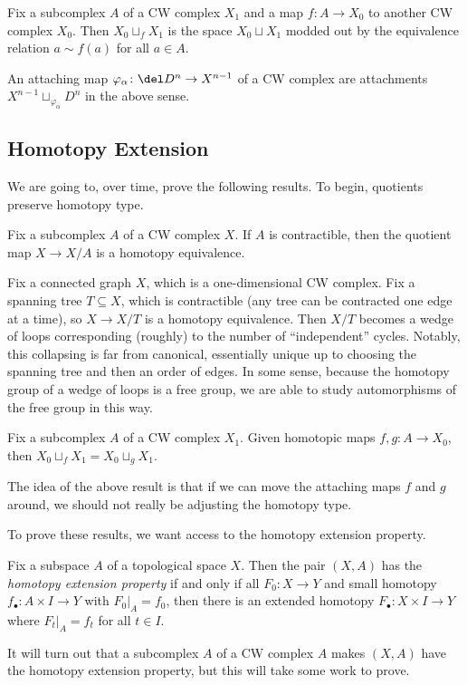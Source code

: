 \documentclass[../notes.tex]{subfiles}
\begin{document}
\begin{definition}[attach]
	Fix a subcomplex $A$ of a CW complex $X_1$ and a map $f\colon A\to X_0$ to another CW complex $X_0$. Then $X_0\sqcup_f X_1$ is the space $X_0\sqcup X_1$ modded out by the equivalence relation $a\sim f(a)$ for all $a\in A$.
\end{definition}
\begin{example}
	An attaching map $\varphi_\alpha\colon\del D^n\to X^{n-1}$ of a CW complex are attachments $X^{n-1}\sqcup_{\varphi_\alpha}D^n$ in the above sense.
\end{example}

\subsection{Homotopy Extension}
We are going to, over time, prove the following results. To begin, quotients preserve homotopy type.
\begin{proposition}
	Fix a subcomplex $A$ of a CW complex $X$. If $A$ is contractible, then the quotient map $X\to X/A$ is a homotopy equivalence.
\end{proposition}
\begin{example}
	Fix a connected graph $X$, which is a one-dimensional CW complex. Fix a spanning tree $T\subseteq X$, which is contractible (any tree can be contracted one edge at a time), so $X\to X/T$ is a homotopy equivalence. Then $X/T$ becomes a wedge of loops corresponding (roughly) to the number of ``independent'' cycles. Notably, this collapsing is far from canonical, essentially unique up to choosing the spanning tree and then an order of edges. In some sense, because the homotopy group of a wedge of loops is a free group, we are able to study automorphisms of the free group in this way.
\end{example}
\begin{proposition}
	Fix a subcomplex $A$ of a CW complex $X_1$. Given homotopic maps $f,g\colon A\to X_0$, then $X_0\sqcup_f X_1=X_0\sqcup_g X_1$.
\end{proposition}
The idea of the above result is that if we can move the attaching maps $f$ and $g$ around, we should not really be adjusting the homotopy type.

To prove these results, we want access to the homotopy extension property.
\begin{definition}
	Fix a subspace $A$ of a topological space $X$. Then the pair $(X,A)$ has the \textit{homotopy extension property} if and only if all $F_0\colon X\to Y$ and small homotopy $f_\bullet\colon A\times I\to Y$ with $F_0|_A=f_0$, then there is an extended homotopy $F_\bullet\colon X\times I\to Y$ where $F_t|_A=f_t$ for all $t\in I$.
\end{definition}
It will turn out that a subcomplex $A$ of a CW complex $A$ makes $(X,A)$ have the homotopy extension property, but this will take some work to prove.
\end{document}
